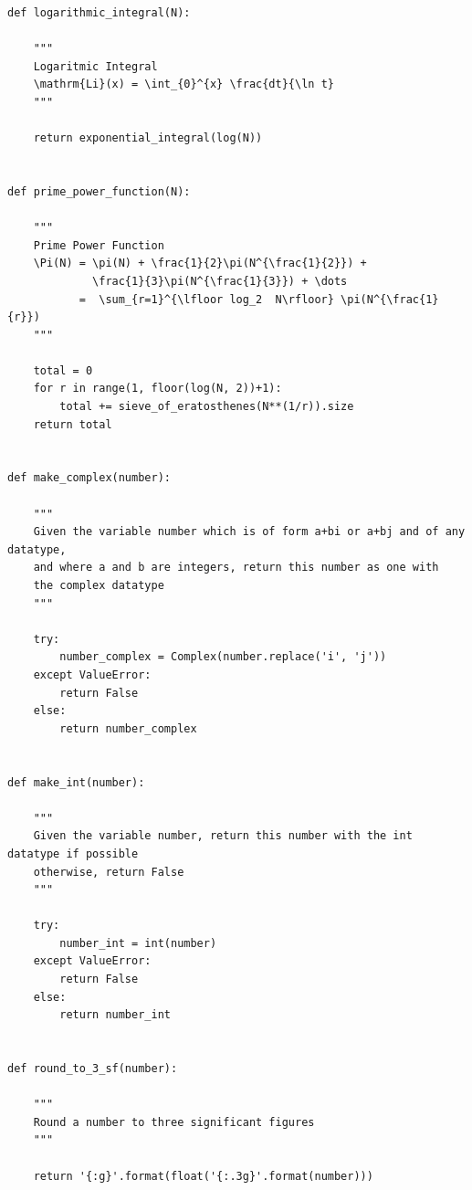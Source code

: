 \documentclass{article}
\begin{document}
\begin{lstlisting}
def logarithmic_integral(N):

    """
    Logaritmic Integral
    \mathrm{Li}(x) = \int_{0}^{x} \frac{dt}{\ln t}
    """

    return exponential_integral(log(N))


def prime_power_function(N):

    """
    Prime Power Function
    \Pi(N) = \pi(N) + \frac{1}{2}\pi(N^{\frac{1}{2}}) +
             \frac{1}{3}\pi(N^{\frac{1}{3}}) + \dots
           =  \sum_{r=1}^{\lfloor log_2  N\rfloor} \pi(N^{\frac{1}{r}})
    """

    total = 0
    for r in range(1, floor(log(N, 2))+1):
        total += sieve_of_eratosthenes(N**(1/r)).size
    return total


def make_complex(number):

    """
    Given the variable number which is of form a+bi or a+bj and of any datatype,
    and where a and b are integers, return this number as one with
    the complex datatype
    """

    try:
        number_complex = Complex(number.replace('i', 'j'))
    except ValueError:
        return False
    else:
        return number_complex


def make_int(number):

    """
    Given the variable number, return this number with the int datatype if possible
    otherwise, return False
    """

    try:
        number_int = int(number)
    except ValueError:
        return False
    else:
        return number_int


def round_to_3_sf(number):

    """
    Round a number to three significant figures
    """

    return '{:g}'.format(float('{:.3g}'.format(number)))
\end{lstlisting}
\end{document}
